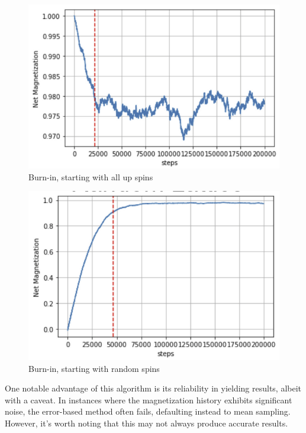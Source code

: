 \documentclass[%
 reprint,
 amsmath,amssymb,
 aps,
]{revtex4-2}
\begin{document}
\begin{figure}
    \centering
    \includegraphics[width=1\linewidth]{burnin,upLattice.png}
    \caption{Burn-in, starting with all up spins}
    \label{fig:burnin,upLattice}
\end{figure}

\begin{figure}
    \centering
    \includegraphics[width=1\linewidth]{burnin,randomLattice.png}
    \caption{Burn-in, starting with random spins}
    \label{fig:burnin,randomLattice}
\end{figure}

One notable advantage of this algorithm is its reliability in yielding results, albeit with a caveat. In instances where the magnetization history exhibits significant noise, the error-based method often fails, defaulting instead to mean sampling. However, it's worth noting that this may not always produce accurate results.
\end{document}
